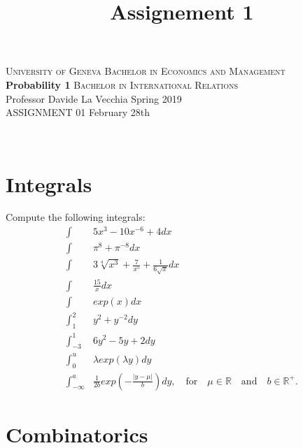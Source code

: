 \documentclass[12pt,a4paper,titlepage]{article}
\title{Assignement 1}
\begin{document}
\noindent \textsc{University of Geneva}     \hfill \textsc{Bachelor in Economics and Management} \\
\textbf{Probability 1}                      \hfill \textsc{Bachelor in International Relations} \\
Professor Davide La Vecchia                 \hfill Spring 2019  \\
ASSIGNMENT 01                               \hfill   February 28th



\noindent
\makebox[\linewidth]{\rule{\textwidth}{0.4pt}}\\[1.5ex]





\section{Integrals}


Compute the following integrals: \\
\begin{align*}
\int& 5x^{3}-10x^{-6}+4 dx \\
\int&  \pi^{8}+\pi^{-8} dx \\
\int& 3\sqrt[4]{x^{3}}+\frac{7}{x^{5}}+\frac{1}{6\sqrt{x}}dx \\
\int& \frac{15}{x}dx \\
\int & exp(x)dx\\
\int_{1}^{2}& y^{2}+y^{-2}dy \\
\int_{-3}^{1}& 6y^{2}-5y+2dy \\
\int_{0}^{u}& \lambda exp(\lambda y) dy \\
\int_{-\infty}^{a}& \frac{1}{2b} exp\left (-\frac{|y-\mu|}{b}\right) dy, \quad \text{for} \quad \mu \in \mathbb{R} \quad \text{and} \quad b \in \mathbb{R}^{+}.
\end{align*}


\vspace{1cm}


\section{Combinatorics}
\end{document}
